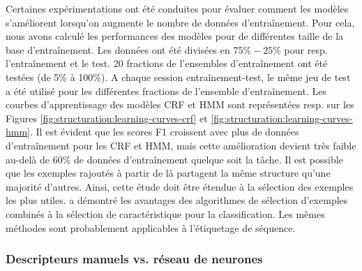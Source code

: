 Certaines expérimentations ont été conduites pour évaluer comment les modèles s'améliorent lorsqu'on augmente le nombre de données d'entraînement. Pour cela, nous avons calculé les performances des modèles pour de différentes taille de la base d'entraînement. Les données ont été divisées en $75\%-25\%$ pour resp. l'entraînement et le test. 20 fractions de l'ensembles d'entraînement ont été testées (de 5\% à 100\%). A chaque session entraînement-test, le même jeu de test a été utilisé pour les différentes fractions de l'ensemble d'entraînement. Les courbes d'apprentissage des modèles CRF et HMM sont représentées resp. sur les Figures \ref{fig:structuration:learning-curves-crf} et \ref{fig:structuration:learning-curves-hmm}. Il est évident que les scores F1 croissent avec plus de données d'entraînement pour les CRF et HMM, mais cette amélioration devient très faible au-delà de 60\% de données d'entraînement quelque soit la tâche. Il est possible que les exemples rajoutés à partir de là partagent la même structure qu'une majorité d'autres. Ainsi, cette étude doit être étendue à la sélection des exemples les plus utiles. \citet{raman2003exampleSelection} a démontré les avantages des algorithmes de sélection d'exemples combinés à la sélection de caractéristique pour la classification. Les mêmes méthodes sont probablement applicables à l'étiquetage de séquence.



\subsubsection{Descripteurs manuels vs. réseau de neurones}

